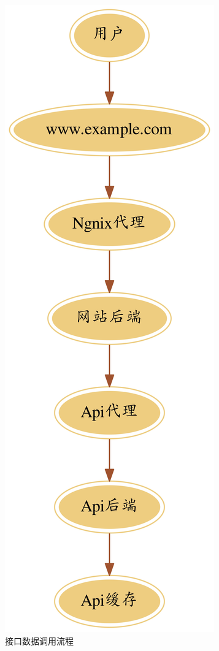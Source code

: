 \documentclass[8pt]{book}
\numberwithin{dummy}{section}
\theoremstyle{ocrenumbox}
\theoremstyle{blacknumex}
\theoremstyle{blacknumbox}
\theoremstyle{ocrenum}
\begin{document}
\begin{figure}[htbp]
	\centering
	\includegraphics[scale=0.08]{api-request.jpg}
	\caption{接口数据调用流程}
	\label{fig:api-request}
\end{figure}
\end{document}
